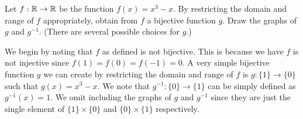 \documentclass[12pt]{article}
\begin{document}
 Let $f: \mathbb{R} \to \mathbb{R}$ be the function $f(x) = x^3 - x$. By restricting the domain
and range of $f$ appropriately, obtain from $f$ a bijective function $g$. Draw the graphs 
of $g$ and $g^{-1}$. (There are several possible choices for $g$.)

We begin by noting that $f$ as defined is not bijective. This is because we have $f$ is not injective
since ${f(1) = f(0) = f(-1) = 0}$. A very simple bijective function $g$ we can create by 
restricting the domain and range of $f$ is $g: \{1\} \to \{0\}$ such that $g(x) = x^3 - x$.
We note that $g^{-1}: \{0\} \to \{1\}$ can be simply defined as $g^{-1}(x) = 1$.
We omit including the graphs of $g$ and $g^{-1}$ since they are just the single element
of $\{1\} \times \{0\}$ and $\{0\} \times \{1\}$ respectively.
 

\end{document}
